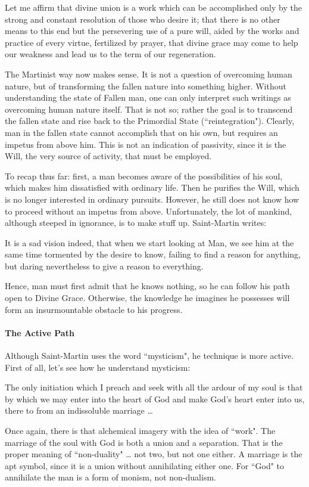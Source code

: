 \begin{quotex}
Let me affirm that divine union is a work which can be accomplished only by the strong and constant resolution of those who desire it; that there is no other means to this end but the persevering use of a pure will, aided by the works and practice of every virtue, fertilized by prayer, that divine grace may come to help our weakness and lead us to the term of our regeneration. 

\end{quotex}
The Martinist way now makes sense. It is not a question of overcoming human nature, but of transforming the fallen nature into something higher. Without understanding the state of Fallen man, one can only interpret such writings as overcoming human nature itself. That is not so; rather the goal is to transcend the fallen state and rise back to the Primordial State (``reintegration"). Clearly, man in the fallen state cannot accomplish that on his own, but requires an impetus from above him. This is not an indication of passivity, since it is the Will, the very source of activity, that must be employed.

To recap thus far: first, a man becomes aware of the possibilities of his soul, which makes him dissatisfied with ordinary life. Then he purifies the Will, which is no longer interested in ordinary pursuits. However, he still does not know how to proceed without an impetus from above. Unfortunately, the lot of mankind, although steeped in ignorance, is to make stuff up. Saint-Martin writes:

\begin{quotex}
It is a sad vision indeed, that when we start looking at Man, we see him at the same time tormented by the desire to know, failing to find a reason for anything, but daring nevertheless to give a reason to everything. 

\end{quotex}
Hence, man must first admit that he knows nothing, so he can follow his path open to Divine Grace. Otherwise, the knowledge he imagines he possesses will form an insurmountable obstacle to his progress.

\paragraph{The Active Path}
Although Saint-Martin uses the word ``mysticism", he technique is more active. First of all, let's see how he understand mysticism:

\begin{quotex}
The only initiation which I preach and seek with all the ardour of my soul is that by which we may enter into the heart of God and make God's heart enter into us, there to from an indissoluble marriage … 

\end{quotex}
Once again, there is that alchemical imagery with the idea of ``work". The marriage of the soul with God is both a union and a separation. That is the proper meaning of ``non-duality" … not two, but not one either. A marriage is the apt symbol, since it is a union without annihilating either one. For ``God" to annihilate the man is a form of monism, not non-dualism.

